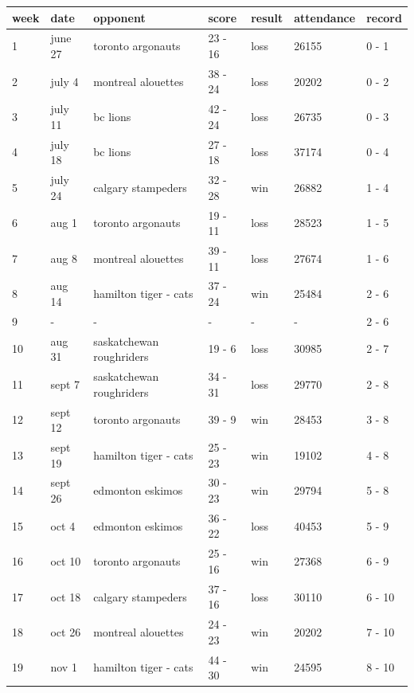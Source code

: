 \documentclass{article}
\begin{document}
\begin{tabular}{lllllll}
\toprule
week & date & opponent & score & result & attendance & record \\
\midrule
1 & june 27 & toronto argonauts & 23 - 16 & loss & 26155 & 0 - 1 \\
2 & july 4 & montreal alouettes & 38 - 24 & loss & 20202 & 0 - 2 \\
3 & july 11 & bc lions & 42 - 24 & loss & 26735 & 0 - 3 \\
4 & july 18 & bc lions & 27 - 18 & loss & 37174 & 0 - 4 \\
5 & july 24 & calgary stampeders & 32 - 28 & win & 26882 & 1 - 4 \\
6 & aug 1 & toronto argonauts & 19 - 11 & loss & 28523 & 1 - 5 \\
7 & aug 8 & montreal alouettes & 39 - 11 & loss & 27674 & 1 - 6 \\
8 & aug 14 & hamilton tiger - cats & 37 - 24 & win & 25484 & 2 - 6 \\
9 & - & - & - & - & - & 2 - 6 \\
10 & aug 31 & saskatchewan roughriders & 19 - 6 & loss & 30985 & 2 - 7 \\
11 & sept 7 & saskatchewan roughriders & 34 - 31 & loss & 29770 & 2 - 8 \\
12 & sept 12 & toronto argonauts & 39 - 9 & win & 28453 & 3 - 8 \\
13 & sept 19 & hamilton tiger - cats & 25 - 23 & win & 19102 & 4 - 8 \\
14 & sept 26 & edmonton eskimos & 30 - 23 & win & 29794 & 5 - 8 \\
15 & oct 4 & edmonton eskimos & 36 - 22 & loss & 40453 & 5 - 9 \\
16 & oct 10 & toronto argonauts & 25 - 16 & win & 27368 & 6 - 9 \\
17 & oct 18 & calgary stampeders & 37 - 16 & loss & 30110 & 6 - 10 \\
18 & oct 26 & montreal alouettes & 24 - 23 & win & 20202 & 7 - 10 \\
19 & nov 1 & hamilton tiger - cats & 44 - 30 & win & 24595 & 8 - 10 \\
\bottomrule
\end{tabular}
\end{document}
